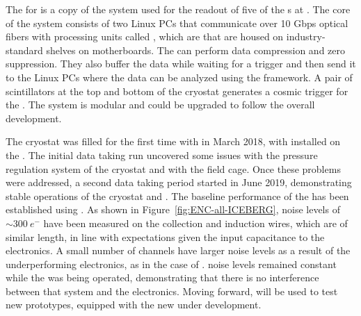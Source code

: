 The  for  is a copy of the system used for the readout
of five of the  s at . The core of the  system 
consists of two Linux PCs that communicate over 10 Gbps optical fibers
with processing units called , which are  that are
housed on industry-standard  shelves on  motherboards.
The  can perform data compression and zero suppression. They also buffer
the data while waiting for a trigger and then send it to the Linux PCs where the data can
be analyzed using the  framework. A pair of scintillators at the top and
bottom of the cryostat generates a cosmic trigger for the .
The system is modular and could be upgraded to follow the overall    
development. 

The  cryostat was filled for the first time with 
in March 2018, with   installed on the . The
initial data taking run uncovered some issues with the pressure regulation system of
the cryostat and with the field cage. Once these problems were addressed, a second
data taking period started in June 2019, demonstrating stable operations of the
cryostat and . The baseline performance of the  
 has been established using  . 
As shown in Figure~\ref{fig:ENC-all-ICEBERG}, noise levels of 
$\sim\SI{300}{e^-}$ have been measured on the collection and induction wires,
which are of similar length, in line with expectations given the input capacitance
to the  electronics. A small number of channels have larger noise levels as a
result of the underperforming  electronics, as in the case of .
 noise levels remained constant while the  was
being operated, demonstrating that there is no interference between that system
and the  electronics. Moving forward,  will be used to
test new  prototypes, equipped with the new  under
development. 

